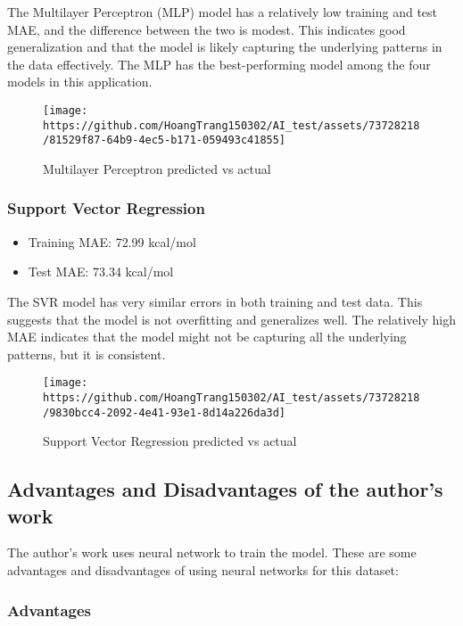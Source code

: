\documentclass{article}
\begin{document}
The Multilayer Perceptron (MLP) model has a relatively low training and
test MAE, and the difference between the two is modest. This indicates
good generalization and that the model is likely capturing the
underlying patterns in the data effectively. The MLP has the
best-performing model among the four models in this application.

\begin{figure}
\centering
\texttt{[image: https://github.com/HoangTrang150302/AI\_test/assets/73728218/81529f87-64b9-4ec5-b171-059493c41855]}
\caption{Multilayer Perceptron predicted vs actual}
\end{figure}

\subsubsection{Support Vector
Regression}\label{support-vector-regression}

\begin{itemize}
\tightlist
\item
  Training MAE: 72.99 kcal/mol
\item
  Test MAE: 73.34 kcal/mol
\end{itemize}

The SVR model has very similar errors in both training and test data.
This suggests that the model is not overfitting and generalizes well.
The relatively high MAE indicates that the model might not be capturing
all the underlying patterns, but it is consistent.

\begin{figure}
\centering
\texttt{[image: https://github.com/HoangTrang150302/AI\_test/assets/73728218/9830bcc4-2092-4e41-93e1-8d14a226da3d]}
\caption{Support Vector Regression predicted vs actual}
\end{figure}

\subsection{Advantages and Disadvantages of the author's
work}\label{advantages-and-disadvantages-of-the-authors-work}

The author's work uses neural network to train the model. These are some
advantages and disadvantages of using neural networks for this dataset:

\subsubsection{Advantages}\label{advantages}
\end{document}

